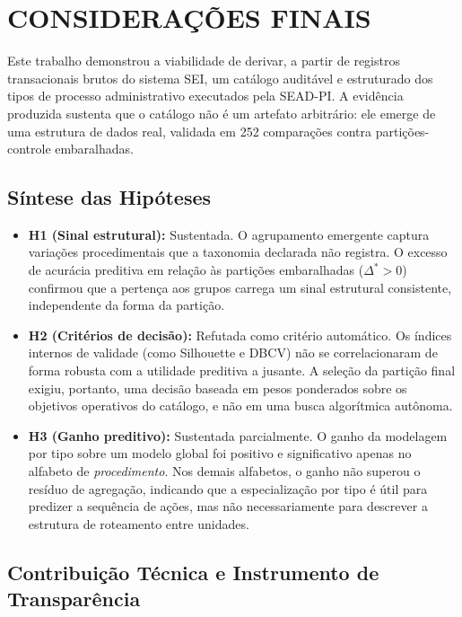 \section{CONSIDERAÇÕES FINAIS}\label{sec:consideracoes}

Este trabalho demonstrou a viabilidade de derivar, a partir de registros transacionais brutos do sistema SEI, um catálogo auditável e estruturado dos tipos de processo administrativo executados pela SEAD-PI. A evidência produzida sustenta que o catálogo não é um artefato arbitrário: ele emerge de uma estrutura de dados real, validada em 252 comparações contra partições-controle embaralhadas.

\subsection*{Síntese das Hipóteses}

\begin{itemize}
    \item \textbf{H1 (Sinal estrutural):} Sustentada. O agrupamento emergente captura variações procedimentais que a taxonomia declarada não registra. O excesso de acurácia preditiva em relação às partições embaralhadas ($\Delta^* > 0$) confirmou que a pertença aos grupos carrega um sinal estrutural consistente, independente da forma da partição.
    \item \textbf{H2 (Critérios de decisão):} Refutada como critério automático. Os índices internos de validade (como Silhouette e DBCV) não se correlacionaram de forma robusta com a utilidade preditiva a jusante. A seleção da partição final exigiu, portanto, uma decisão baseada em pesos ponderados sobre os objetivos operativos do catálogo, e não em uma busca algorítmica autônoma.
    \item \textbf{H3 (Ganho preditivo):} Sustentada parcialmente. O ganho da modelagem por tipo sobre um modelo global foi positivo e significativo apenas no alfabeto de \emph{procedimento}. Nos demais alfabetos, o ganho não superou o resíduo de agregação, indicando que a especialização por tipo é útil para predizer a sequência de ações, mas não necessariamente para descrever a estrutura de roteamento entre unidades.
\end{itemize}

\subsection*{Contribuição Técnica e Instrumento de Transparência}


